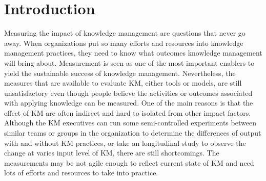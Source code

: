 \documentclass{elsarticle}
\begin{document}
\section{ Introduction}
Measuring  the impact of knowledge management are questions that never
go away. When organizations put so many efforts and resources into
knowledge management practices, they need to know what outcomes
knowledge management will bring about. Measurement is seen as one of
the most important enablers to yield the sustainable success of  knowledge management\cite{1290466}.    Nevertheless,  the measures that are
available to evaluate KM, either tools or models, are still
unsatisfactory even though  people believe the activities or outcomes associated with applying
knowledge can be measured\cite{rudy1998state}.   One of the main reasons is that the effect of KM are
often indirect and hard to isolated from other impact
factors. Although the KM executives can run some semi-controlled
experiments between similar teams or groups in the organization to
determine the differences of  output with and without KM practices, or
take an longitudinal study  to observe the change at varies input
level of KM, there are still shortcomings. The measurements may be not
 agile enough to reflect current state of KM and need lots of efforts
 and resources to take into practice.   
\end{document}
